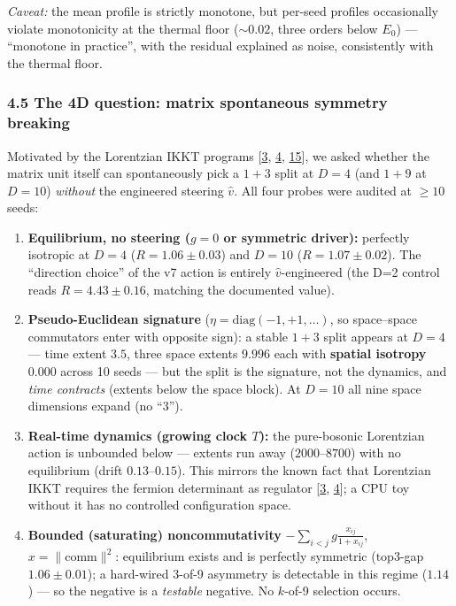 \emph{Caveat:} the mean profile is strictly monotone, but per-seed
profiles occasionally violate monotonicity at the thermal floor
(\(\sim0.02\), three orders below \(E_0\)) --- ``monotone in practice'',
with the residual explained as noise, consistently with the thermal
floor.

\subsubsection{4.5 The 4D question: matrix spontaneous symmetry
breaking}\label{the-4d-question-matrix-spontaneous-symmetry-breaking}

Motivated by the Lorentzian IKKT programs {[}\hyperref[ref-3]{3},
\hyperref[ref-4]{4}, \hyperref[ref-15]{15}{]}, we asked whether the
matrix unit itself can spontaneously pick a \(1{+}3\) split at \(D=4\)
(and \(1{+}9\) at \(D=10\)) \emph{without} the engineered steering
\(\hat v\). All four probes were audited at \(\ge 10\) seeds:

\begin{enumerate}
\def\labelenumi{\arabic{enumi}.}
\tightlist
\item
  \textbf{Equilibrium, no steering (\(g=0\) or symmetric driver):}
  perfectly isotropic at \(D=4\) (\(R=1.06\pm0.03\)) and \(D=10\)
  (\(R=1.07\pm0.02\)). The ``direction choice'' of the v7 action is
  entirely \(\hat v\)-engineered (the D=2 control reads
  \(R=4.43\pm0.16\), matching the documented value).
\item
  \textbf{Pseudo-Euclidean signature}
  (\(\eta=\mathrm{diag}(-1,+1,\dots)\), so space--space commutators
  enter with opposite sign): a stable \(1{+}3\) split appears at \(D=4\)
  --- time extent \(3.5\), three space extents \(9.996\) each with
  \textbf{spatial isotropy \(0.000\)} across 10 seeds --- but the split
  is the signature, not the dynamics, and \emph{time contracts} (extents
  below the space block). At \(D=10\) all nine space dimensions expand
  (no ``3'').
\item
  \textbf{Real-time dynamics (growing clock \(T\)):} the pure-bosonic
  Lorentzian action is unbounded below --- extents run away
  (\(2000\)--\(8700\)) with no equilibrium (drift \(0.13\)--\(0.15\)).
  This mirrors the known fact that Lorentzian IKKT requires the fermion
  determinant as regulator {[}\hyperref[ref-3]{3},
  \hyperref[ref-4]{4}{]}; a CPU toy without it has no controlled
  configuration space.
\item
  \textbf{Bounded (saturating) noncommutativity}
  \(-\sum_{i<j} g\frac{x_{ij}}{1+x_{ij}}\), \(x=\|\mathrm{comm}\|^2\):
  equilibrium exists and is perfectly symmetric (\(\mathrm{top3}\)-gap
  \(1.06\pm0.01\)); a hard-wired 3-of-9 asymmetry is detectable in this
  regime (\(1.14\)) --- so the negative is a \emph{testable} negative.
  No \(k\)-of-9 selection occurs.
\end{enumerate}

